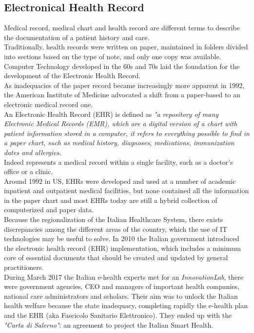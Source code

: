 \subsection{Electronical Health Record}
\label{subsection:electronic_health_record}
Medical record, medical chart and health record are different terms to describe the documentation of a patient history and care.\\
Traditionally, health records were written on paper, maintained in folders divided into sections based on the type of note, and only one copy was available.
Computer Technology developed in the 60s and 70s laid the foundation for the development of the Electronic Health Record.\\
As inadequacies of the paper record became increasingly more apparent in 1992, the American Institute of Medicine advocated a shift from a paper-based to an electronic medical record one.\cite{Evans2016ElectronicHR}\\
An Electronic Health Record (EHR) is defined as \textit{"a repository of many Electronic Medical Records (EMR), which are a digital version of a chart with patient information stored in a computer, it refers to everything possible to find in a paper chart, such as medical history, diagnoses, medications, immunization dates and allergies.}\cite{emr}\\
Indeed represents a medical record within a single facility, such as a doctor's office or a clinic.\\
Around 1992 in US, EHRs were developed and used at a number of academic inpatient and outpatient medical facilities, but none contained all the information in the paper chart and most EHRs today are still a hybrid collection of computerized and paper data.
\cite{Evans2016ElectronicHR}\\
Because the regionalization of the Italian Healthcare System, there exists discrepancies among the different areas of the country, which the use of IT technologies may be useful to solve. In 2010 the Italian government introduced the electronic health record (EHR) implementation, which includes a minimum core of essential documents that should be created and updated by general practitioners.\\
During March 2017 the Italian e-health experts met for an \textit{InnovationLab}, there were government agencies, CEO and managers of important health companies, national care administrators and scholars. Their aim was to unlock the Italian health welfare because the state inadequacy, completing rapidly the e-health plan and the EHR (aka Fascicolo Sanitario Elettronico). They ended up with the \textit{"Carta di Salerno"}: an agreement to project the Italian Smart Health.
